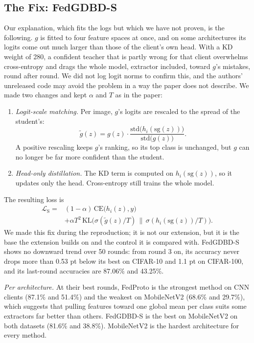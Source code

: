 \documentclass[conference]{IEEEtran}
\begin{document}
\subsection{The Fix: FedGDBD-S}
\label{sec:fix}
Our explanation, which fits the logs but which we have not proven, is the following. $g$ is fitted to four feature spaces at once, and on some architectures its logits come out much larger than those of the client's own head. With a KD weight of 280, a confident teacher that is partly wrong for that client overwhelms cross-entropy and drags the whole model, extractor included, toward $g$'s mistakes, round after round. We did not log logit norms to confirm this, and the authors' unreleased code may avoid the problem in a way the paper does not describe. We made two changes and kept $\alpha$ and $T$ as in the paper:
\begin{enumerate}
\item \textit{Logit-scale matching.} Per image, $g$'s logits are rescaled to the spread of the student's:
\begin{equation}
\tilde{g}(z) = g(z)\cdot \frac{\mathrm{std}\big(h_i(\mathrm{sg}(z))\big)}{\mathrm{std}\big(g(z)\big)}.
\label{eq:scale}
\end{equation}
A positive rescaling keeps $g$'s ranking, so its top class is unchanged, but $g$ can no longer be far more confident than the student.
\item \textit{Head-only distillation.} The KD term is computed on $h_i(\mathrm{sg}(z))$, so it updates only the head. Cross-entropy still trains the whole model.
\end{enumerate}
The resulting loss is
\begin{equation}
\begin{split}
\mathcal{L}_{\text{S}} = {}&(1-\alpha)\,\mathrm{CE}\big(h_i(z),y\big)\\
&+ \alpha T^2\,\mathrm{KL}\big(\sigma(\tilde{g}(z)/T)\,\big\|\,\sigma(h_i(\mathrm{sg}(z))/T)\big).
\end{split}
\label{eq:fgs}
\end{equation}
We made this fix during the reproduction; it is not our extension, but it is the base the extension builds on and the control it is compared with. FedGDBD-S shows no downward trend over 50 rounds: from round 3 on, its accuracy never drops more than 0.53 pt below its best on CIFAR-10 and 1.1 pt on CIFAR-100, and its last-round accuracies are 87.06\% and 43.25\%.

\textit{Per architecture.} At their best rounds, FedProto is the strongest method on CNN clients (87.1\% and 51.4\%) and the weakest on MobileNetV2 (68.6\% and 29.7\%), which suggests that pulling features toward one global mean per class suits some extractors far better than others. FedGDBD-S is the best on MobileNetV2 on both datasets (81.6\% and 38.8\%). MobileNetV2 is the hardest architecture for every method.
\end{document}
